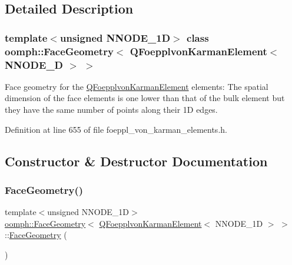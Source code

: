 \subsection{Detailed Description}
\subsubsection*{template$<$unsigned N\+N\+O\+D\+E\+\_\+1D$>$\newline
class oomph\+::\+Face\+Geometry$<$ Q\+Foepplvon\+Karman\+Element$<$ N\+N\+O\+D\+E\+\_\+D $>$ $>$}

Face geometry for the \hyperlink{classoomph_1_1QFoepplvonKarmanElement}{Q\+Foepplvon\+Karman\+Element} elements\+: The spatial dimension of the face elements is one lower than that of the bulk element but they have the same number of points along their 1D edges. 

Definition at line 655 of file foeppl\+\_\+von\+\_\+karman\+\_\+elements.\+h.



\subsection{Constructor \& Destructor Documentation}
\mbox{\label{classoomph_1_1FaceGeometry_3_01QFoepplvonKarmanElement_3_01NNODE__1D_01_4_01_4_a8a335d862dfc293ada89c1aa2b52efa0}} 
\subsubsection{\texorpdfstring{Face\+Geometry()}{FaceGeometry()}}
{\footnotesize\ttfamily template$<$unsigned N\+N\+O\+D\+E\+\_\+1D$>$ \\
\hyperlink{classoomph_1_1FaceGeometry}{oomph\+::\+Face\+Geometry}$<$ \hyperlink{classoomph_1_1QFoepplvonKarmanElement}{Q\+Foepplvon\+Karman\+Element}$<$ N\+N\+O\+D\+E\+\_\+1D $>$ $>$\+::\hyperlink{classoomph_1_1FaceGeometry}{Face\+Geometry} (\begin{DoxyParamCaption}{ }\end{DoxyParamCaption})\hspace{0.3cm}{\ttfamily [inline]}}



